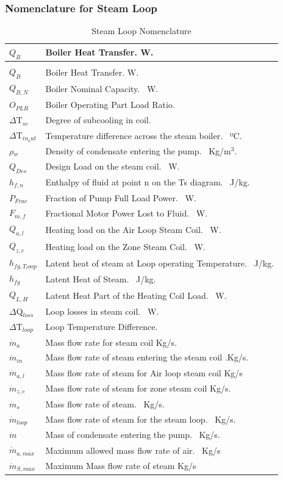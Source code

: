 \subsubsection{Nomenclature for Steam Loop}\label{nomenclature-for-steam-loop}

\begin{longtable}[c]{p{1.0in}p{4.0in}}
\caption{Steam Loop Nomenclature \label{table:steam-loop-nomenclature}} \tabularnewline
\toprule 
\({Q_{B}}\) & Boiler Heat Transfer. W. \tabularnewline
\midrule
\endfirsthead

\caption[]{Steam Loop Nomenclature} \tabularnewline
\toprule 
\({Q_{B}}\) & Boiler Heat Transfer. W. \tabularnewline
\midrule
\endhead

\({Q_{B,N}}\) & Boiler Nominal Capacity.~ W. \tabularnewline
\({O_{PLR}}\) & Boiler Operating Part Load Ratio.~ \tabularnewline
\(\Delta\)T\(_{sc}\) & Degree of subcooling in coil.~ \tabularnewline
\(\Delta\)T\(_{in_out}\) & Temperature difference across the steam boiler.~ ºC. \tabularnewline
\(\rho\)\(_{w}\) & Density of condensate entering the pump.~ Kg/m\(^3\).~ \tabularnewline
\(Q_{Des}\) & Design Load on the steam coil.~ W. \tabularnewline
\(h_{f,n}\) & Enthalpy of fluid at point n on the Ts diagram.~ J/kg. \tabularnewline
\(P_{Frac}\) & Fraction of Pump Full Load Power.~ W. \tabularnewline
\(F_{m,f}\) & Fractional Motor Power Lost to Fluid.~ W. \tabularnewline
\(Q_{a,l}\) & Heating load on the Air Loop Steam Coil.~ W. \tabularnewline
\(Q_{z,c}\) & Heating load on the Zone Steam Coil.~ W. \tabularnewline
\(h_{fg,T_loop}\) & Latent heat of steam at Loop operating Temperature.~ J/kg. \tabularnewline
\(h_{fg}\) & Latent Heat of Steam.~ J/kg. \tabularnewline
\(Q_{L,H}\) & Latent Heat Part of the Heating Coil Load.~ W. \tabularnewline
\(\Delta\)Q\(_{loss}\) & Loop losses in steam coil.~ W. \tabularnewline
\(\Delta\)T\(_{loop}\) & Loop Temperature Difference. \tabularnewline
\(\dot m_{a}\) & Mass flow rate for steam coil Kg/s. \tabularnewline
\(\dot m_{in}\) & Mass flow rate of steam entering the steam coil .Kg/s. \tabularnewline
\(\dot m_{a,l}\) & Mass flow rate of steam for Air loop steam coil Kg/s \tabularnewline
\(\dot m_{z,c}\) & Mass flow rate of steam for zone steam coil Kg/s. \tabularnewline
\(\dot m_{s}\) & Mass flow rate of steam.~ Kg/s. \tabularnewline
\(\dot m_{loop}\) & Mass flow rate of steam for the steam loop.~ Kg/s. \tabularnewline
\(\dot m\) & Mass of condensate entering the pump.~ Kg/s. \tabularnewline
\(\dot m_{a,max}\) & Maximum allowed mass flow rate of air.~ Kg/s \tabularnewline
\(\dot m_{S,max}\) & Maximum Mass flow rate of steam Kg/s \tabularnewline

\end{longtable}
